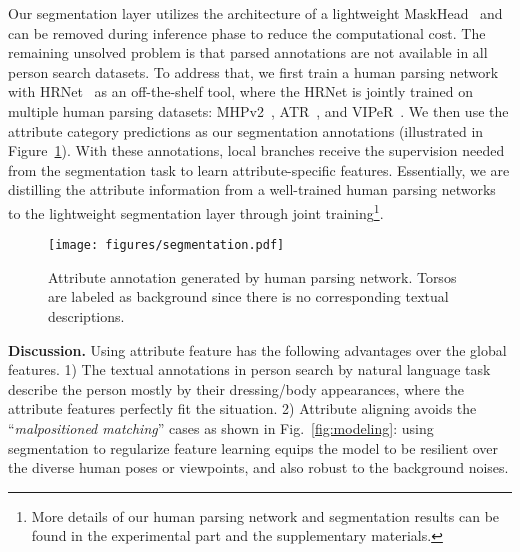 \documentclass[runningheads]{llncs}
\begin{document}
Our segmentation layer utilizes the architecture of a lightweight MaskHead~\cite{he2017mask} and can be removed during inference phase to reduce the computational cost. The remaining unsolved problem is that parsed annotations are not available in all person search datasets. 
To address that, we first train a human parsing network with HRNet~\cite{Sun_2019_CVPR} as an off-the-shelf tool, where the HRNet is jointly trained on multiple human parsing datasets: MHPv2~\cite{zhao2018understanding}, ATR~\cite{ATR}, and VIPeR~\cite{tan2019attention}.
We then use the attribute category predictions as our segmentation annotations (illustrated in Figure~\ref{fig:annotation}). With these annotations, local branches receive the supervision needed from the segmentation task to learn attribute-specific features. 
Essentially, we are distilling the attribute information from a well-trained human parsing networks to the lightweight segmentation layer through joint training\footnote[1]{More details of our human parsing network and segmentation results can be found in the experimental part and the supplementary materials.}.

\begin{figure}[t]
\centering
\texttt{[image: figures/segmentation.pdf]}
\caption{
Attribute annotation generated by human parsing network. Torsos are labeled as background since there is no corresponding textual descriptions.
}
\label{fig:annotation}
\end{figure}

\noindent\textbf{Discussion.} 
Using attribute feature has the following advantages over the global features. 1) The textual annotations in person search by natural language task describe the person mostly by their dressing/body appearances, where the attribute features perfectly fit the situation.
2) Attribute aligning avoids the ``\textit{malpositioned matching}'' cases as shown in Fig.~\ref{fig:modeling}:
using segmentation to regularize feature learning equips the model to be resilient over the diverse human poses or viewpoints, and also robust to the background noises.
\end{document}
